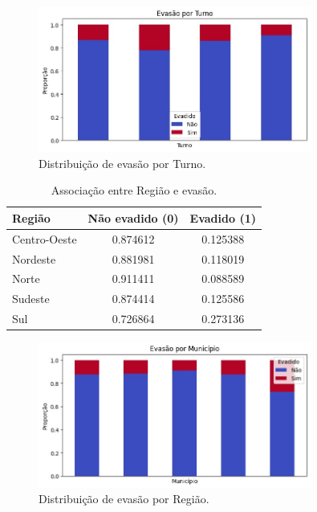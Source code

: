 \documentclass[english, spanish, brazilian]{RBIEarticle} %
\begin{document}
\begin{figure}[H]\centering
	\includegraphics[width=0.8\textwidth]{images/evasao-turno.jpeg}
	\caption{Distribuição de evasão por Turno.}
	\label{fig:cat-turno-hist}
\end{figure}

\begin{table}[H]
	\centering
	\caption{Associação entre Região e evasão.}
	\label{tab:cat-regiao}
	\begin{tabular}{lcc}
		\toprule
		\textbf{Região} & \textbf{Não evadido (0)} & \textbf{Evadido (1)} \\
		\midrule
		Centro-Oeste & 0.874612 & 0.125388 \\
		Nordeste & 0.881981 & 0.118019 \\
		Norte & 0.911411 & 0.088589 \\
		Sudeste & 0.874414 & 0.125586 \\
		Sul & 0.726864 & 0.273136 \\
		\bottomrule
	\end{tabular}
\end{table}

\begin{figure}[H]\centering
	\includegraphics[width=0.8\textwidth]{images/evasao-municipio.jpeg}
	\caption{Distribuição de evasão por Região.}
	\label{fig:cat-regiao-hist}
\end{figure}
\end{document}
